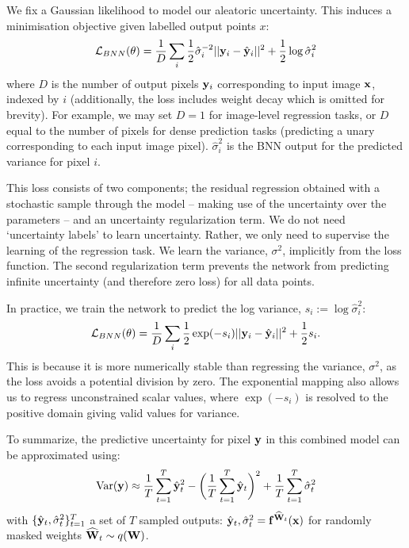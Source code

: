 We fix a Gaussian likelihood to model our aleatoric uncertainty.
This induces a minimisation objective given labelled output points $x$:
\begin{equation}
\mathcal{L}_{BNN}(\theta) = \frac{1}{D} \sum_i \frac{1}{2} \hat{\sigma}^{-2}_i ||\mathbf{y}_i-\hat{\mathbf{y}}_i||^2 + \frac{1}{2} \log{\hat{\sigma}_i^2}
\end{equation}
where $D$ is the number of output pixels $\mathbf{y}_i$ corresponding to input image $\mathbf{x}$, indexed by $i$ (additionally, the loss includes weight decay which is omitted for brevity). For example, we may set $D=1$ for image-level regression tasks, or $D$ equal to the number of pixels for dense prediction tasks (predicting a unary corresponding to each input image pixel). $\hat{\sigma}^2_i$ is the BNN output for the predicted variance for pixel $i$.

This loss consists of two components; the residual regression obtained with a stochastic sample through the model -- making use of the uncertainty over the parameters  -- and an uncertainty regularization term. We do not need `uncertainty labels' to learn uncertainty. Rather, we only need to supervise the learning of the regression task. We learn the variance, $\sigma^2$, implicitly from the loss function. The second regularization term prevents the network from predicting infinite uncertainty (and therefore zero loss) for all data points.

In practice, we train the network to predict the log variance, $s_i := \log \hat{\sigma}_i^2$: 
\begin{equation}
\mathcal{L}_{BNN}(\theta) = \frac{1}{D} \sum_i \frac{1}{2} \exp (-s_i) ||\mathbf{y}_i-\hat{\mathbf{y}}_i||^2 + \frac{1}{2} s_i.
\label{eqn:aleatoric_regression_loss}
\end{equation}
This is because it is more numerically stable than regressing the variance, $\sigma^2$, as the loss avoids a potential division by zero. The exponential mapping also allows us to regress unconstrained scalar values, where $\exp(-s_i)$ is resolved to the positive domain giving valid values for variance.

To summarize, the predictive uncertainty for pixel $\mathbf{y}$ in this combined model can be approximated using:
\begin{equation}
\text{Var}(\mathbf{y}) \approx \frac{1}{T} \sum_{t=1}^T \hat{\mathbf{y}}_{t}^2
- \bigg( \frac{1}{T} \sum_{t=1}^T \hat{\mathbf{y}}_{t} \bigg)^2 + \frac{1}{T} \sum_{t=1}^T \hat{\sigma}_{t}^2
\end{equation}
with $\{ \hat{\mathbf{y}}_{t}, \hat{\sigma}_{t}^2 \}_{t=1}^T$ a set of $T$ sampled outputs: $\hat{\mathbf{y}}_{t}, \hat{\sigma}_{t}^2 = \mathbf{f}^{{\widehat{\mathbf{W}}}_t}(\mathbf{x})$ for randomly masked weights ${\widehat{\mathbf{W}}}_t \sim q(\mathbf{W})$.


